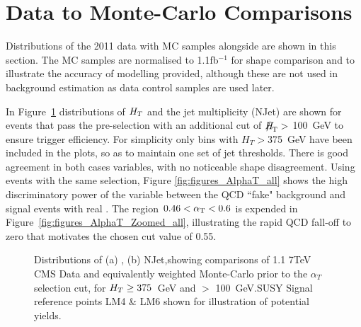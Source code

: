 \section{Data to Monte-Carlo Comparisons }

Distributions of the 2011 data with MC samples alongside are shown in this section. The MC samples are normalised to 1.1fb$^{-1}$ for shape comparison and to illustrate the accuracy of modelling provided, although these are not used in background estimation as data control samples are used later. 

In Figure~\ref{fig:preselplota} distributions of $H_{T} $ and the jet multiplicity (NJet) are shown for events that pass the pre-selection with an additional cut of $\MHT >$ 100~GeV to ensure trigger efficiency. For simplicity only bins with $H_{T} > $375~GeV have been included in the plots, so as to maintain one set of jet thresholds. There is good agreement in both cases variables, with no noticeable shape disagreement. Using events with the same selection, Figure \ref{fig:figures_AlphaT_all} shows the high discriminatory power of the \alt variable between the QCD ``fake" \MET background and signal events with real \MET. The region $0.46 < \alpha_{\text{T}} < 0.6$ is expended in Figure~\ref{fig:figures_AlphaT_Zoomed_all}, illustrating the rapid QCD fall-off to zero that motivates the chosen cut value of 0.55.

\begin{figure}[htpb]
\centering
\begin{minipage}[b]{1.\linewidth}
\centering
{}
\hspace{0.2cm}
\end{minipage}
    \caption{\label{fig:preselplota}Distributions of (a) \HT, (b) NJet,showing comparisons of 1.1  7TeV CMS Data and equivalently weighted Monte-Carlo prior to the $\alpha_{T}$ selection cut, for $H_{T}  \geq 375$~GeV and \MHT $>$ 100~GeV.SUSY Signal reference points LM4 \& LM6 shown for illustration of potential yields.}
\end{figure}

